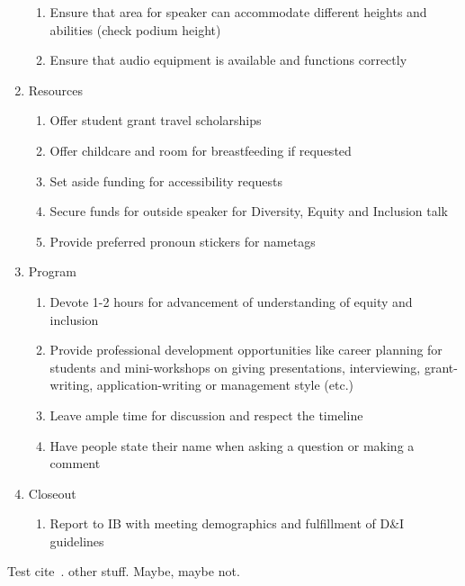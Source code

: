 \documentclass{article}
\begin{document}
\begin{enumerate}
\begin{enumerate}[label=\alph*.]
      \item Ensure that area for speaker can accommodate different heights and abilities (check podium height)
      \item Ensure that audio equipment is available and functions correctly
    \end{enumerate}
    \item Resources
    \begin{enumerate}[label=\alph*.]
      \item Offer student grant travel scholarships
      \item Offer childcare and room for breastfeeding if requested
      \item Set aside funding for accessibility requests
      \item Secure funds for outside speaker for Diversity, Equity and Inclusion talk
      \item Provide preferred pronoun stickers for nametags
    \end{enumerate}
    \item Program
    \begin{enumerate}[label=\alph*.]
      \item Devote 1-2 hours for advancement of understanding of equity and inclusion
      \item Provide professional development opportunities like career planning for students and mini-workshops on giving presentations, interviewing, grant-writing, application-writing or management style (etc.)
      \item Leave ample time for discussion and respect the timeline
      \item Have people state their name when asking a question or making a comment
    \end{enumerate}
    \item Closeout
    \begin{enumerate}[label=\alph*.]
      \item Report to IB with meeting demographics and fulfillment of D\&I guidelines
    \end{enumerate}
  \end{enumerate}

  Test cite~\cite{AudioAccessibility, TheAtlantic, DCMP, ReelWords, A11yNYC, Wired, AngryDeafPeople}.
  other stuff. Maybe, maybe not.
  \printbibliography
\end{document}

